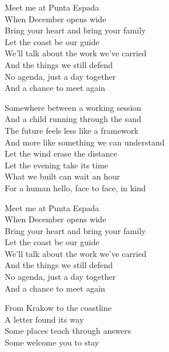 \begin{lyrics}
Meet me at Punta Espada\\
When December opens wide\\
Bring your heart and bring your family\\
Let the coast be our guide\\
We'll talk about the work we've carried\\
And the things we still defend\\
No agenda, just a day together\\
And a chance to meet again

Somewhere between a working session\\
And a child running through the sand\\
The future feels less like a framework\\
And more like something we can understand\\
Let the wind erase the distance\\
Let the evening take its time\\
What we built can wait an hour\\
For a human hello, face to face, in kind

Meet me at Punta Espada\\
When December opens wide\\
Bring your heart and bring your family\\
Let the coast be our guide\\
We'll talk about the work we've carried\\
And the things we still defend\\
No agenda, just a day together\\
And a chance to meet again

From Krakow to the coastline\\
A letter found its way\\
Some places teach through answers\\
Some welcome you to stay
\end{lyrics}

